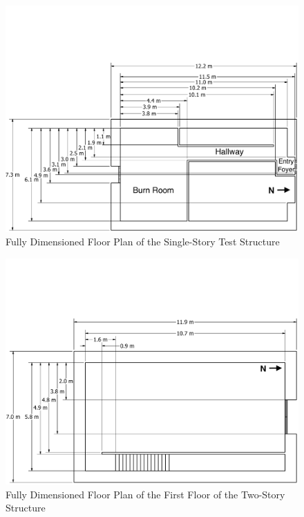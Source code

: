 \documentclass[12pt,oneside]{book}
\begin{document}
\begin{figure}[!ht]
	\includegraphics[width=\columnwidth]{../Figures/Floor_Plans/PDFs/East_Structure/DelCo_2012_East_Structure_Detailed}
	\caption{Fully Dimensioned Floor Plan of the Single-Story Test Structure}
	\label{fig:Test_Structure_Floor_Plan_Detailed}
\end{figure}

\clearpage

\begin{figure}[!ht]
	\includegraphics[width=\columnwidth]{../../DelCo_2014_2015/Drawings/PDFs/CAFS/West_Structure_1st_Floor_Detailed}
	\caption{Fully Dimensioned Floor Plan of the First Floor of the Two-Story Structure}
	\label{fig:dimensioned_first_2story_detailed}
\end{figure}
\end{document}
